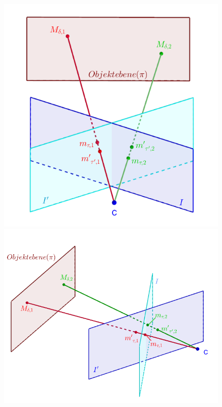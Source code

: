 \begin{figure}[!htb]
	\includegraphics[width=\linewidth]{images/HomographyPZ_beschriftet.png}
	\label{fig:HomographyPZFront}
	\endminipage\hfill
	\includegraphics[width=\linewidth]{images/HomographyPZSide_beschriftet.png}

\end{figure}
